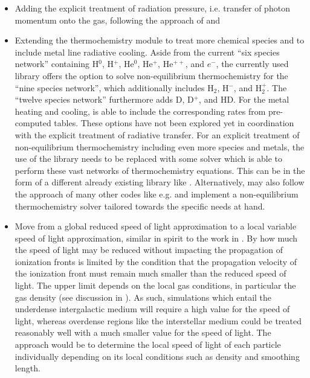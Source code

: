 \begin{itemize}

\item Adding the explicit treatment of radiation pressure, i.e. transfer of photon momentum onto
the gas, following the approach of \citet{ramses-rt15} and
\citet{hopkinsNumericalProblemsCoupling2019}

\item Extending the thermochemistry module to treat more chemical species and to include metal line
radiative cooling. Aside from the current ``six species network'' containing H$^0$, H$^+$, He$^0$,
He$^+$, He$^{++}$, and $e^-$, the currently used \grackle \citep{smithGrackleChemistryCooling2017}
library offers the option to solve non-equilibrium thermochemistry for the ``nine species network'',
which additionally includes H$_2$, H$^-$, and H$_2^+$. The ``twelve species network'' furthermore
adds D, D$^+$, and HD. For the metal heating and cooling, \grackle is able to include the
corresponding rates from pre-computed tables. These options have not been explored yet in
coordination with the explicit treatment of radiative transfer. For an explicit treatment of
non-equilibrium thermochemistry including even more species and metals, the use of the \grackle
library needs to be replaced with some solver which is able to perform these vast networks of
thermochemistry equations. This can be in the form of a different already existing library like
 \citep{grassiKROMEPackageEmbed2014}. Alternatively, \GEARRT may also follow the
approach of many other codes like e.g. \citet{katzRAMSESRTZNonEquilibriumMetal2022,
richingsNonequilibriumChemistryCooling2014, baczynskiFerventChemistrycoupledIonizing2015,
sarkarNewIonizationNetwork2021} and implement a non-equilibrium thermochemistry solver tailored
towards the specific needs at hand.

\item Move from a global reduced speed of light approximation to a local variable speed of light
approximation, similar in spirit to the work in \citet{katzInterpretingALMAObservations2017}. By
how much the speed of light may be reduced without impacting the propagation of ionization fronts
is limited by the condition that the propagation velocity of the ionization front must remain much
smaller than the reduced speed of light. The upper limit depends on the local gas conditions, in
particular the gas density (see discussion in \citet{ramses-rt13}). As such, simulations which
entail the underdense intergalactic medium will require a high value for the speed of
light, whereas overdense regions like the interstellar medium could be treated reasonably well with
a much smaller value for the speed of light. The approach would be to determine the local speed of
light of each particle individually depending on its local conditions such as density and smoothing
length.


\end{itemize}
